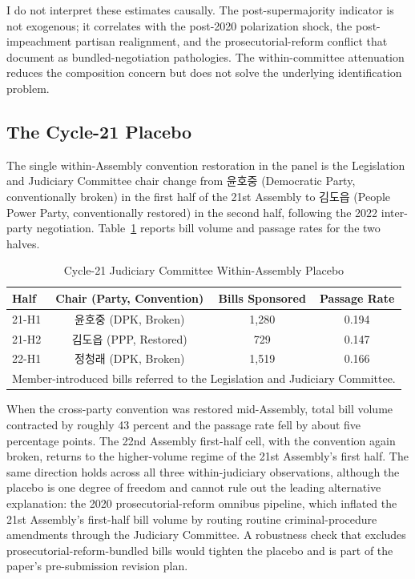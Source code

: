 \documentclass[11pt]{article}
\begin{document}
I do not interpret these estimates causally. The post-supermajority indicator is not exogenous; it correlates with the post-2020 polarization shock, the post-impeachment partisan realignment, and the prosecutorial-reform conflict that \citet{leekim2022} document as bundled-negotiation pathologies. The within-committee attenuation reduces the composition concern but does not solve the underlying identification problem.

\subsection{The Cycle-21 Placebo}

The single within-Assembly convention restoration in the panel is the Legislation and Judiciary Committee chair change from 윤호중 (Democratic Party, conventionally broken) in the first half of the 21st Assembly to 김도읍 (People Power Party, conventionally restored) in the second half, following the 2022 inter-party negotiation. Table~\ref{tab:placebo} reports bill volume and passage rates for the two halves.

\begin{table}[ht]
\centering
\caption{Cycle-21 Judiciary Committee Within-Assembly Placebo}
\label{tab:placebo}
\begin{tabular}{lccc}
\toprule
Half & Chair (Party, Convention) & Bills Sponsored & Passage Rate \\
\midrule
21-H1 & 윤호중 (DPK, Broken) & 1,280 & 0.194 \\
21-H2 & 김도읍 (PPP, Restored) & 729 & 0.147 \\
22-H1 & 정청래 (DPK, Broken) & 1,519 & 0.166 \\
\bottomrule
\multicolumn{4}{l}{\footnotesize Member-introduced bills referred to the Legislation and Judiciary Committee.} \\
\end{tabular}
\end{table}

When the cross-party convention was restored mid-Assembly, total bill volume contracted by roughly 43 percent and the passage rate fell by about five percentage points. The 22nd Assembly first-half cell, with the convention again broken, returns to the higher-volume regime of the 21st Assembly's first half. The same direction holds across all three within-judiciary observations, although the placebo is one degree of freedom and cannot rule out the leading alternative explanation: the 2020 prosecutorial-reform omnibus pipeline, which inflated the 21st Assembly's first-half bill volume by routing routine criminal-procedure amendments through the Judiciary Committee. A robustness check that excludes prosecutorial-reform-bundled bills would tighten the placebo and is part of the paper's pre-submission revision plan.
\end{document}

